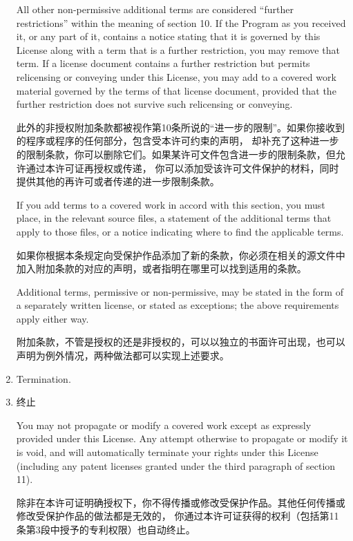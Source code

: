 \documentclass[11pt]{article}
\begin{document}
\begin{enumerate}
        All other non-permissive additional terms are considered ``further
        restrictions'' within the meaning of section 10.  If the Program as you
        received it, or any part of it, contains a notice stating that it is
        governed by this License along with a term that is a further
        restriction, you may remove that term.  If a license document contains
        a further restriction but permits relicensing or conveying under this
        License, you may add to a covered work material governed by the terms
        of that license document, provided that the further restriction does
        not survive such relicensing or conveying.

        此外的非授权附加条款都被视作第10条所说的“进一步的限制”。如果你接收到的程序或程序的任何部分，包含受本许可约束的声明，
        却补充了这种进一步的限制条款，你可以删除它们。如果某许可文件包含进一步的限制条款，但允许通过本许可证再授权或传递，
        你可以添加受该许可文件保护的材料，同时提供其他的再许可或者传递的进一步限制条款。

        If you add terms to a covered work in accord with this section, you
        must place, in the relevant source files, a statement of the
        additional terms that apply to those files, or a notice indicating
        where to find the applicable terms.

        如果你根据本条规定向受保护作品添加了新的条款，你必须在相关的源文件中加入附加条款的对应的声明，或者指明在哪里可以找到适用的条款。

        Additional terms, permissive or non-permissive, may be stated in the
        form of a separately written license, or stated as exceptions;
        the above requirements apply either way.

        附加条款，不管是授权的还是非授权的，可以以独立的书面许可出现，也可以声明为例外情况，两种做法都可以实现上述要求。

  \item Termination.
  \item 终止

        You may not propagate or modify a covered work except as expressly
        provided under this License.  Any attempt otherwise to propagate or
        modify it is void, and will automatically terminate your rights under
        this License (including any patent licenses granted under the third
        paragraph of section 11).

        除非在本许可证明确授权下，你不得传播或修改受保护作品。其他任何传播或修改受保护作品的做法都是无效的，
        你通过本许可证获得的权利（包括第11条第3段中授予的专利权限）也自动终止。


\end{enumerate}
\end{document}
